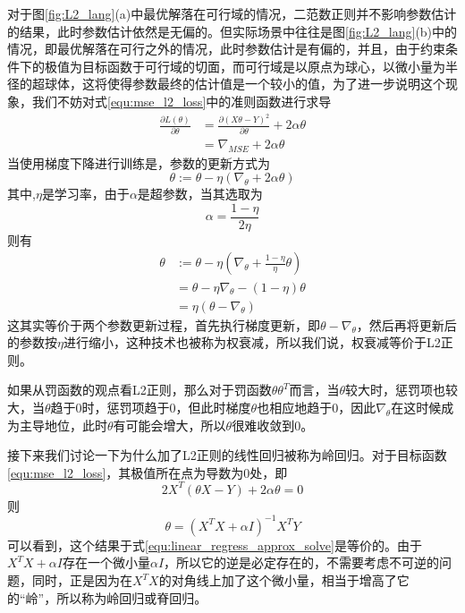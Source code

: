 对于图\ref{fig:L2_lang}(a)中最优解落在可行域的情况，二范数正则并不影响参数估计的结果，此时参数估计依然是无偏的。但实际场景中往往是图\ref{fig:L2_lang}(b)中的情况，即最优解落在可行之外的情况，此时参数估计是有偏的，并且，由于约束条件下的极值为目标函数于可行域的切面，而可行域是以原点为球心，以微小量为半径的超球体，这将使得参数最终的估计值是一个较小的值，为了进一步说明这个现象，我们不妨对式\ref{equ:mse_l2_loss}中的准则函数进行求导
\begin{equation}
\begin{split}
	\frac{\partial L(\theta)}{\partial \theta} &= \frac{\partial(X\theta  - Y)^2}{\partial \theta} + 2\alpha \theta\\
	&= \nabla_{MSE} + 2\alpha \theta
\end{split}
\end{equation}
当使用梯度下降进行训练是，参数的更新方式为
\begin{equation}
	\theta := \theta -\eta (\nabla_{\theta} + 2\alpha \theta)
\end{equation}
其中,$\eta$是学习率，由于$\alpha$是超参数，当其选取为
\begin{equation}
	\alpha = \frac{1 - \eta}{2\eta}
\end{equation}
则有
\begin{equation}
\begin{split}
	\theta &:= \theta -\eta (\nabla_{\theta} + \frac{1-\eta}{\eta} \theta)\\
	&= \theta - \eta\nabla_{\theta} - (1-\eta)\theta\\
	&=\eta(\theta - \nabla_{\theta})
 \end{split}
\end{equation}
这其实等价于两个参数更新过程，首先执行梯度更新，即$\theta - \nabla_{\theta}$，然后再将更新后的参数按$\eta$进行缩小，这种技术也被称为权衰减，所以我们说，权衰减等价于L2正则。

如果从罚函数的观点看L2正则，那么对于罚函数$\theta\theta^T$而言，当$\theta$较大时，惩罚项也较大，当$\theta$趋于0时，惩罚项趋于0，但此时梯度$\theta$也相应地趋于0，因此$\nabla_{\theta}$在这时候成为主导地位，此时$\theta$有可能会增大，所以$\theta$很难收敛到0。


接下来我们讨论一下为什么加了L2正则的线性回归被称为岭回归。对于目标函数\ref{equ:mse_l2_loss}，其极值所在点为导数为0处，即
\begin{equation}
	2X^T(\theta X - Y) + 2\alpha\theta = 0
\end{equation}
则
\begin{equation}\label{equ:L2_theta}
	\theta = (X^TX + \alpha I)^{-1}X^TY
\end{equation}
可以看到，这个结果于式\ref{equ:linear_regress_approx_solve}是等价的。由于$X^TX + \alpha I$存在一个微小量$\alpha I$，所以它的逆是必定存在的，不需要考虑不可逆的问题，同时，正是因为在$X^TX$的对角线上加了这个微小量，相当于增高了它的“岭”，所以称为岭回归或脊回归。 

